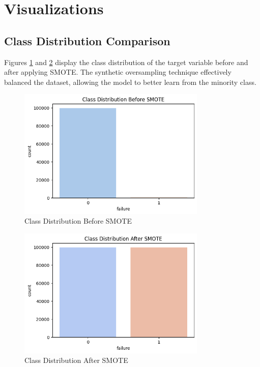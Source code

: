 	\section{Visualizations}
	\subsection{Class Distribution Comparison}
	Figures \ref{fig:before_smote} and \ref{fig:after_smote} display the class distribution of the target variable before and after applying SMOTE. The synthetic oversampling technique effectively balanced the dataset, allowing the model to better learn from the minority class.
	
	\begin{figure}[h!]
		\centering
		\includegraphics[width=0.8\textwidth]{./figures_akash/before_smote.png} %
		\caption{Class Distribution Before SMOTE}
		\label{fig:before_smote}
	\end{figure}
	
	\begin{figure}[h!]
		\centering
		\includegraphics[width=0.8\textwidth]{./figures_akash/after_smote.png} %
		\caption{Class Distribution After SMOTE}
		\label{fig:after_smote}
	\end{figure}
	
